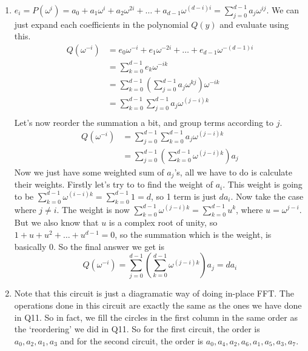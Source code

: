 \documentclass[12pt]{report}
\begin{document}
\begin{enumerate}[label=\textbf{\arabic*.}]
    \item $e_i = P(\omega^i) = a_0 + a_1 \omega^i + a_2 \omega^{2i} + \dots + a_{d-1} \omega^{(d-i)i} = \sum_{j=0}^{d-1} a_j \omega^{ij}$. We can just expand each 
    coefficients in the polynomial $Q(y)$ and evaluate using this.
    \begin{align*}
        Q(\omega^{-i}) &= e_0 \omega^{-i} + e_1 \omega^{-2i} + \dots + e_{d-1} \omega^{-(d-1)i} \\
        &= \sum_{k=0}^{d-1} e_k \omega^{-ik} \\
        &= \sum_{k=0}^{d-1} \left(\sum_{j=0}^{d-1} a_j \omega^{kj}\right) \omega^{-ik} \\
        &= \sum_{k=0}^{d-1} \sum_{j=0}^{d-1} a_j \omega^{(j-i)k} \\
    \end{align*}
    Let's now reorder the summation a bit, and group terms according to $j$.
    \begin{align*}
        Q(\omega^{-i}) &= \sum_{j=0}^{d-1} \sum_{k=0}^{d-1} a_j \omega^{(j-i)k} \\
        &= \sum_{j=0}^{d-1} \left(\sum_{k=0}^{d-1} \omega^{(j-i)k}\right) a_j
    \end{align*}
    Now we just have some weighted sum of $a_j$'s, all we have to do is calculate their weights. Firstly let's try to to find the weight of $a_i$.
    This weight is going to be $\sum_{k=0}^{d-1} \omega^{(i-i)k} = \sum_{k=0}^{d-1} 1 = d$, so 1 term is just $d a_i$. Now take the case where
    $j \neq i$. The weight is now $\sum_{k=0}^{d-1} \omega^{(j-i)k} = \sum_{k=0}^{d-1} u^k$, where $u = \omega^{j-i}$. But we also know that $u$ is
    a complex root of unity, so $1 + u + u^2 + \dots + u^{d-1} = 0$, so the summation which is the weight, is basically 0. So the final answer we get
    is 
    \[ Q(\omega^{-i}) = \sum_{j=0}^{d-1} \left(\sum_{k=0}^{d-1} \omega^{(j-i)k}\right) a_j = d a_i \]

    \item Note that this circuit is just a diagramatic way of doing in-place FFT. The operations done in this circuit are exactly the same as the ones 
    we have done in Q11. So in fact, we fill the circles in the first column in the same order as the `reordering' we did in Q11. So for the first circuit,
    the order is $a_0, a_2, a_1, a_3$ and for the second circuit, the order is $a_0, a_4, a_2, a_6, a_1, a_5, a_3, a_7$.


\end{enumerate}
\end{document}
